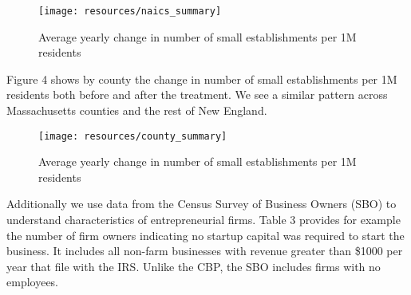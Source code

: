 \documentclass[12pt]{article}
\begin{document}
\begin{figure}[H]
	\centering
	\texttt{[image: resources/naics\_summary]}
	\caption{Average yearly change in number of small establishments per 1M residents}
\end{figure}

Figure 4 shows by county the change in number of small establishments per 1M residents both before and after the treatment. We see a similar pattern across Massachusetts counties and the rest of New England. 

\begin{figure}[H]
	\centering
	\texttt{[image: resources/county\_summary]}
	\caption{Average yearly change in number of small establishments per 1M residents}
\end{figure}


Additionally we use data from the Census Survey of Business Owners (SBO) to understand characteristics of entrepreneurial firms. Table 3 provides for example the number of firm owners indicating no startup capital was required to start the business.  It includes all non-farm businesses with revenue greater than \$1000 per year that file with the IRS. Unlike the CBP, the SBO includes firms with no employees.

\begin{flushleft}
\end{flushleft}
\end{document}
